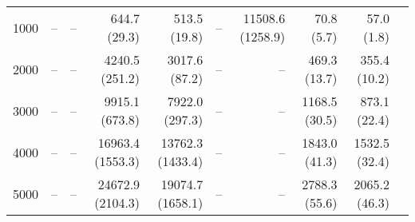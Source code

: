 \documentclass[utf8]{frontiersSCNS} %
\begin{document}
\begin{table*}[htp]
{\begin{tabular}{|r|r|r|r|r|r|r|r|r|r|}
    1000 & --            & --              & 644.7 (29.3)    & 513.5 (19.8)     & --             & 11508.6 (1258.9) & 70.8 (5.7)    & 57.0 (1.8) \\
    2000 & --            & --              & 4240.5 (251.2)  & 3017.6 (87.2)    & --             & --               & 469.3 (13.7)  & 355.4 (10.2)\\
    3000 & --            & --              & 9915.1 (673.8)  & 7922.0 (297.3)   & --             & --               & 1168.5 (30.5) & 873.1 (22.4)\\
    4000 & --            & --              & 16963.4 (1553.3)& 13762.3 (1433.4) & --             & --               & 1843.0 (41.3) & 1532.5 (32.4) \\
    5000 & --            & --              & 24672.9 (2104.3)& 19074.7 (1658.1) & --             & --               & 2788.3 (55.6) & 2065.2 (46.3) \\
    \hline
  \end{tabular}
  }
\end{table*}
\end{document}
